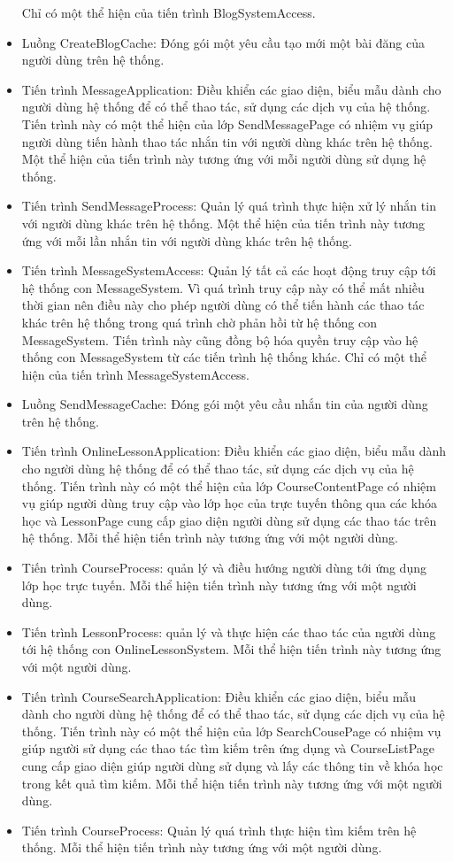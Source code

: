 \documentclass[./../main_file.tex]{subfiles}
\begin{document}
\begin{itemize}
		Chỉ có một thể hiện của tiến trình BlogSystemAccess.
		\item Luồng CreateBlogCache: Đóng gói một yêu cầu tạo mới một bài đăng của người dùng trên hệ thống.
		\item Tiến trình MessageApplication: Điều khiển các giao diện, biểu mẫu dành cho người dùng hệ thống để có thể thao tác, sử dụng các dịch vụ của hệ thống. Tiến trình này có một thể hiện của lớp SendMessagePage có nhiệm vụ giúp người dùng tiến hành thao tác nhắn tin với người dùng khác trên hệ thống.
		Một thể hiện của tiến trình này tương ứng với mỗi người dùng sử dụng hệ thống.
		\item Tiến trình SendMessageProcess: Quản lý quá trình thực hiện xử lý nhắn tin với người dùng khác trên hệ thống.
		Một thể hiện của tiến trình này tương ứng với mỗi lần nhắn tin với người dùng khác trên hệ thống.
		\item Tiến trình MessageSystemAccess: Quản lý tất cả các hoạt động truy cập tới hệ thống con MessageSystem. Vì quá trình truy cập này có thể mất nhiều thời gian nên điều này cho phép người dùng có thể tiến hành các thao tác khác trên hệ thống trong quá trình chờ phản hồi từ hệ thống con MessageSystem. Tiến trình này cũng đồng bộ hóa quyền truy cập vào hệ thống con MessageSystem từ các tiến trình hệ thống khác.
		Chỉ có một thể hiện của tiến trình MessageSystemAccess.
		\item Luồng SendMessageCache: Đóng gói một yêu cầu nhắn tin của người dùng trên hệ thống.
		\item Tiến trình OnlineLessonApplication: Điều khiển các giao diện, biểu mẫu dành cho người dùng hệ thống để có thể thao tác, sử dụng các dịch vụ của hệ thống. Tiến trình này có một thể hiện của lớp CourseContentPage có nhiệm vụ giúp người dùng truy cập vào lớp học của trực tuyến thông qua các khóa học và LessonPage cung cấp giao diện người dùng sử dụng các thao tác trên hệ thống.
		Mỗi thể hiện tiến trình này tương ứng với một người dùng.
		\item Tiến trình CourseProcess: quản lý và điều hướng người dùng tới ứng dụng lớp học trực tuyến.
		Mỗi thể hiện tiến trình này tương ứng với một người dùng.
		\item Tiến trình LessonProcess: quản lý và thực hiện các thao tác của người dùng tới  hệ thống con OnlineLessonSystem.
		Mỗi thể hiện tiến trình này tương ứng với một người dùng.
		
		\item Tiến trình CourseSearchApplication: Điều khiển các giao diện, biểu mẫu dành cho người dùng hệ thống để có thể thao tác, sử dụng các dịch vụ của hệ thống. Tiến trình này có một thể hiện của lớp SearchCousePage có nhiệm vụ giúp người sử dụng các thao tác tìm kiếm trên ứng dụng và CourseListPage cung cấp giao diện giúp người dùng sử dụng và lấy các thông tin về khóa học trong kết quả tìm kiếm.
		Mỗi thể hiện tiến trình này tương ứng với một người dùng.
		\item Tiến trình CourseProcess: Quản lý quá trình thực hiện tìm kiếm trên hệ thống.
		Mỗi thể hiện tiến trình này tương ứng với một người dùng.
		

\end{itemize}
\end{document}
